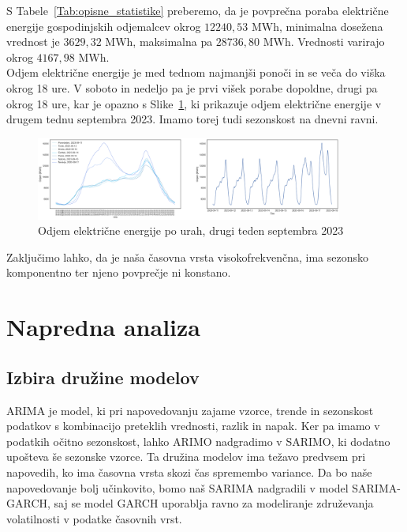 \documentclass[a4paper, 11pt]{article}
\begin{document}
\noindent S Tabele~\ref{Tab:opisne_statistike} preberemo, da je povprečna poraba električne energije gospodinjskih odjemalcev
okrog $12240{,}53 $ MWh, minimalna dosežena vrednost je $3629{,}32$ MWh, maksimalna pa $28736{,}80$ MWh. Vrednosti varirajo
okrog $4167{,}98$ MWh. \\

\noindent Odjem električne energije je med tednom najmanjši ponoči in se veča do viška okrog 18 ure. 
V soboto in nedeljo pa je prvi višek porabe dopoldne, drugi pa okrog 18 ure, kar je opazno s Slike~\ref{fig:odjem_teden}, ki prikazuje odjem 
električne energije v drugem tednu septembra 2023. Imamo torej tudi sezonskost na dnevni ravni.

\begin{figure}[h!]
    \centering
    \caption{Odjem električne energije po urah, drugi teden septembra 2023}\par\medskip
    \label{fig:odjem_teden}
    \includegraphics[width=0.9\textwidth]{odjem_teden.png}
\end{figure}

\noindent Zaključimo lahko, da je naša časovna vrsta visokofrekvenčna, ima sezonsko komponentno ter njeno povprečje ni konstano.



\section{Napredna analiza}

\subsection{Izbira družine modelov}

ARIMA je model, ki pri napovedovanju zajame vzorce, trende in sezonskost podatkov s kombinacijo preteklih 
vrednosti, razlik in napak. Ker pa imamo v podatkih očitno sezonskost, lahko ARIMO nadgradimo v SARIMO, ki dodatno
upošteva še sezonske vzorce. Ta družina modelov ima težavo predvsem pri napovedih, ko ima časovna vrsta 
skozi čas spremembo variance. Da bo naše napovedovanje bolj učinkovito, bomo naš SARIMA nadgradili v 
model SARIMA-GARCH, saj se model GARCH uporablja ravno za modeliranje združevanja volatilnosti 
v podatke časovnih vrst.~\cite{ArimaGarch}
\end{document}
